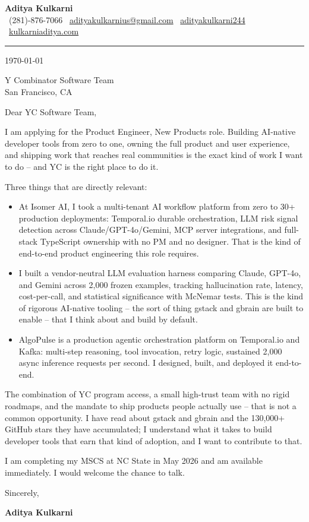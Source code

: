 \documentclass[11pt,a4paper]{article}
\makeatletter
\newcommand{\CLheader}{%
  \begin{center}
    {\Large \textbf{Aditya Kulkarni}}\\[4pt]
    \textcolor{brand}{\faPhone}\ (281)-876-7066 \quad
    \textcolor{brand}{\faEnvelope}\ \href{mailto:adityakulkarnius@gmail.com}{adityakulkarnius@gmail.com} \quad
    \textcolor{brand}{\faLinkedin}\ \href{https://linkedin.com/in/adityakulkarni244}{adityakulkarni244} \quad
    \textcolor{brand}{\faGlobe}\ \href{https://kulkarniaditya.com}{kulkarniaditya.com}
  \end{center}
  \vspace{4pt}
  \textcolor{brand}{\rule{\linewidth}{1.2pt}}
  \vspace{6pt}
}
\makeatother
\begin{document}
\CLheader

\today

\vspace{8pt}

Y Combinator Software Team\\
San Francisco, CA

\vspace{8pt}

Dear YC Software Team,

\vspace{6pt}

I am applying for the Product Engineer, New Products role. Building AI-native developer tools from zero to one, owning the full product and user experience, and shipping work that reaches real communities is the exact kind of work I want to do -- and YC is the right place to do it.

\vspace{6pt}

Three things that are directly relevant:

\vspace{4pt}
\begin{itemize}
  \item[\textcolor{brand}{\faAngleRight}] At Isomer AI, I took a multi-tenant AI workflow platform from zero to 30+ production deployments: Temporal.io durable orchestration, LLM risk signal detection across Claude/GPT-4o/Gemini, MCP server integrations, and full-stack TypeScript ownership with no PM and no designer. That is the kind of end-to-end product engineering this role requires.
  \item[\textcolor{brand}{\faAngleRight}] I built a vendor-neutral LLM evaluation harness comparing Claude, GPT-4o, and Gemini across 2,000 frozen examples, tracking hallucination rate, latency, cost-per-call, and statistical significance with McNemar tests. This is the kind of rigorous AI-native tooling -- the sort of thing gstack and gbrain are built to enable -- that I think about and build by default.
  \item[\textcolor{brand}{\faAngleRight}] AlgoPulse is a production agentic orchestration platform on Temporal.io and Kafka: multi-step reasoning, tool invocation, retry logic, sustained 2,000 async inference requests per second. I designed, built, and deployed it end-to-end.
\end{itemize}

\vspace{6pt}

The combination of YC program access, a small high-trust team with no rigid roadmaps, and the mandate to ship products people actually use -- that is not a common opportunity. I have read about gstack and gbrain and the 130,000+ GitHub stars they have accumulated; I understand what it takes to build developer tools that earn that kind of adoption, and I want to contribute to that.

\vspace{6pt}

I am completing my MSCS at NC State in May 2026 and am available immediately. I would welcome the chance to talk.

\vspace{12pt}

Sincerely,

\vspace{6pt}
\textbf{Aditya Kulkarni}
\end{document}
